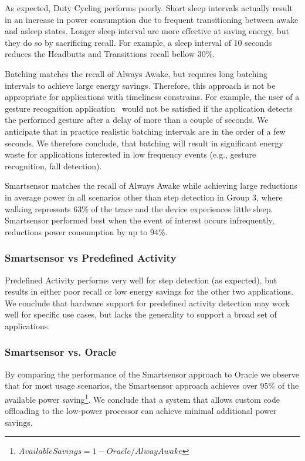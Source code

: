 As expected, Duty Cycling performs poorly.  Short sleep intervals
actually result in an increase in power consumption due to frequent
transitioning between awake and asleep states.  Longer sleep interval
are more effective at saving energy, but they do so by sacrificing
recall.  For example, a sleep interval of 10 seconds reduces the
Headbutts and Transittions recall bellow 30\%.

Batching matches the recall of Always Awake, but requires long
batching intervals to achieve large energy savings.  Therefore, this
approach is not be appropriate for applications with timeliness
constrains.  For example, the user of a gesture recognition
application~\cite{liu2009uwave,schlomer2008gesture} would not be
satisfied if the application detects the performed gesture after a
delay of more than a couple of seconds.  We anticipate that in
practice realistic batching intervals are in the order of a few
seconds.  We therefore conclude, that batching will result in
significant energy waste for applications interested in low frequency
events (e.g., gesture recognition, fall detection).

Smartsensor matches the recall of Always Awake while achieving large
reductions in average power in all scenarios other than step detection
in Group 3, where walking represents 63\% of the trace and the device
experiences little sleep.  Smartsensor performed best when the event
of interest occurs infrequently, reductions power consumption by up to
94\%.  

\subsubsection{Smartsensor vs Predefined Activity}

Predefined Activity performs very well for step detection (as
expected), but results in either poor recall or low energy savings for
the other two applications.  We conclude that hardware support for
predefined activity detection may work well for specific use cases,
but lacks the generality to support a broad set of applications.


\subsubsection{Smartsensor vs. Oracle}

By comparing the performance of the Smartsensor approach to Oracle we
observe that for most usage scenarios, the Smartsensor approach
achieves over 95\% of the available power
saving\footnote{$AvailableSavings=1-Oracle/AlwayAwake$}.
We conclude that a system that allows
custom code offloading to the low-power processor can achieve minimal
additional power savings.



